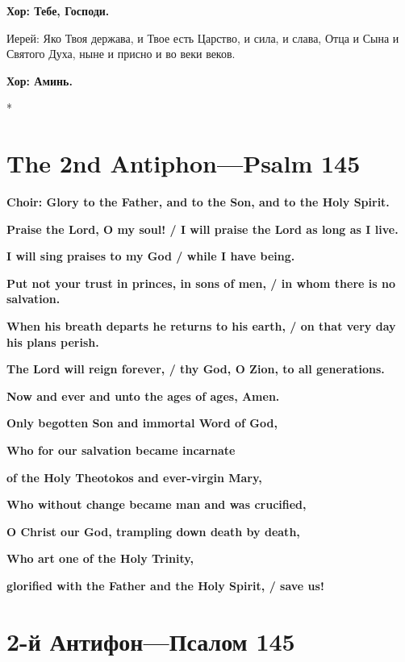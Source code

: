 \documentclass[12pt,a4paper,titlepage]{report}
\begin{document}
\begin{paracol}[1]{2}
	\textbf{Хор: Тебе, Господи.}
	
	Иерей: Яко Твоя держава, и Твое есть Царство, и сила, и слава, Отца и Сына и Святого Духа, ныне и присно и во веки веков.
	
	\textbf{Хор: Аминь.}
	
	\switchcolumn[0]*
	
	\section*{The 2nd Antiphon---Psalm 145}
	\textbf{Choir: Glory to the Father, and to the Son, and to the Holy Spirit.}
	\medskip
	
	\textbf{Praise the Lord, O my soul! / I will praise the Lord as long as I live.}
	
	\textbf{I will sing praises to my God / while I have being.}
	
	\textbf{Put not your trust in princes, in sons of men, / in whom there is no salvation.}
	
	\textbf{When his breath departs he returns to his earth, / on that very day his plans perish.}
	
	\textbf{The Lord will reign forever, / thy God, O Zion, to all generations.}
	
	\medskip
	\textbf{Now and ever and unto the ages of ages, Amen.}
	\medskip
	
	\textbf{Only begotten Son and immortal Word of God,}
	
	\textbf{Who for our salvation became incarnate}
	
	\textbf{of the Holy Theotokos and ever-virgin Mary,}
	
	\textbf{Who without change became man and was crucified,}
	
	\textbf{O Christ our God, trampling down death by death,}
	
	\textbf{Who art one of the Holy Trinity,}
	
	\textbf{glorified with the Father and the Holy Spirit, / save us!}
	
	\switchcolumn[1]
	
	\section*{2-й Антифон---Псалом 145}
	

\end{paracol}
\end{document}
